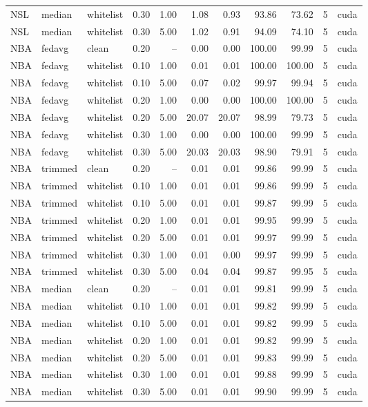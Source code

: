 \begin{tabular}{lllrrrrrrrl}
NSL & median & whitelist & 0.30 & 1.00 & 1.08 & 0.93 & 93.86 & 73.62 & 5 & cuda \\
NSL & median & whitelist & 0.30 & 5.00 & 1.02 & 0.91 & 94.09 & 74.10 & 5 & cuda \\
NBA & fedavg & clean & 0.20 & -- & 0.00 & 0.00 & 100.00 & 99.99 & 5 & cuda \\
NBA & fedavg & whitelist & 0.10 & 1.00 & 0.01 & 0.01 & 100.00 & 100.00 & 5 & cuda \\
NBA & fedavg & whitelist & 0.10 & 5.00 & 0.07 & 0.02 & 99.97 & 99.94 & 5 & cuda \\
NBA & fedavg & whitelist & 0.20 & 1.00 & 0.00 & 0.00 & 100.00 & 100.00 & 5 & cuda \\
NBA & fedavg & whitelist & 0.20 & 5.00 & 20.07 & 20.07 & 98.99 & 79.73 & 5 & cuda \\
NBA & fedavg & whitelist & 0.30 & 1.00 & 0.00 & 0.00 & 100.00 & 99.99 & 5 & cuda \\
NBA & fedavg & whitelist & 0.30 & 5.00 & 20.03 & 20.03 & 98.90 & 79.91 & 5 & cuda \\
NBA & trimmed & clean & 0.20 & -- & 0.01 & 0.01 & 99.86 & 99.99 & 5 & cuda \\
NBA & trimmed & whitelist & 0.10 & 1.00 & 0.01 & 0.01 & 99.86 & 99.99 & 5 & cuda \\
NBA & trimmed & whitelist & 0.10 & 5.00 & 0.01 & 0.01 & 99.87 & 99.99 & 5 & cuda \\
NBA & trimmed & whitelist & 0.20 & 1.00 & 0.01 & 0.01 & 99.95 & 99.99 & 5 & cuda \\
NBA & trimmed & whitelist & 0.20 & 5.00 & 0.01 & 0.01 & 99.97 & 99.99 & 5 & cuda \\
NBA & trimmed & whitelist & 0.30 & 1.00 & 0.01 & 0.00 & 99.97 & 99.99 & 5 & cuda \\
NBA & trimmed & whitelist & 0.30 & 5.00 & 0.04 & 0.04 & 99.87 & 99.95 & 5 & cuda \\
NBA & median & clean & 0.20 & -- & 0.01 & 0.01 & 99.81 & 99.99 & 5 & cuda \\
NBA & median & whitelist & 0.10 & 1.00 & 0.01 & 0.01 & 99.82 & 99.99 & 5 & cuda \\
NBA & median & whitelist & 0.10 & 5.00 & 0.01 & 0.01 & 99.82 & 99.99 & 5 & cuda \\
NBA & median & whitelist & 0.20 & 1.00 & 0.01 & 0.01 & 99.82 & 99.99 & 5 & cuda \\
NBA & median & whitelist & 0.20 & 5.00 & 0.01 & 0.01 & 99.83 & 99.99 & 5 & cuda \\
NBA & median & whitelist & 0.30 & 1.00 & 0.01 & 0.01 & 99.88 & 99.99 & 5 & cuda \\
NBA & median & whitelist & 0.30 & 5.00 & 0.01 & 0.01 & 99.90 & 99.99 & 5 & cuda \\
\bottomrule
\end{tabular}
